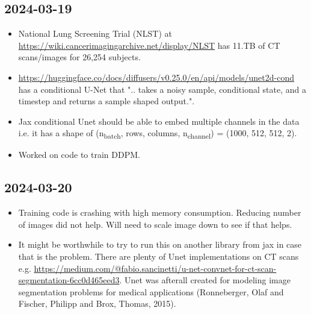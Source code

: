 \documentclass[a4paper, 11pt]{article}
\begin{document}
\subsection{2024-03-19}
\label{sec:orgea51822}
\begin{itemize}
\item National Lung Screening Trial (NLST) at \url{https://wiki.cancerimagingarchive.net/display/NLST} has 11.TB of CT scans/images for 26,254 subjects.
\item \url{https://huggingface.co/docs/diffusers/v0.25.0/en/api/models/unet2d-cond} has a conditional U-Net that ".. takes a noisy sample, conditional state, and a timestep and returns a sample shaped output.".
\item Jax conditional Unet should be able to embed multiple channels in the data i.e. it has a shape of (n\textsubscript{batch}, rows, columns, n\textsubscript{channel}) = (1000, 512, 512, 2).
\item Worked on code to train DDPM.
\end{itemize}
\subsection{2024-03-20}
\label{sec:orge5c3100}
\begin{itemize}
\item Training code is crashing with high memory consumption. Reducing number of images did not help. Will need to scale image down to see if that helps.
\item It might be worthwhile to try to run this on another library from jax in case that is the problem. There are plenty of Unet implementations on CT scans e.g. \url{https://medium.com/@fabio.sancinetti/u-net-convnet-for-ct-scan-segmentation-6cc0d465eed3}. Unet was afterall created for modeling image segmentation problems for medical applications (Ronneberger, Olaf and Fischer, Philipp and Brox, Thomas, 2015).
\end{itemize}
\end{document}

